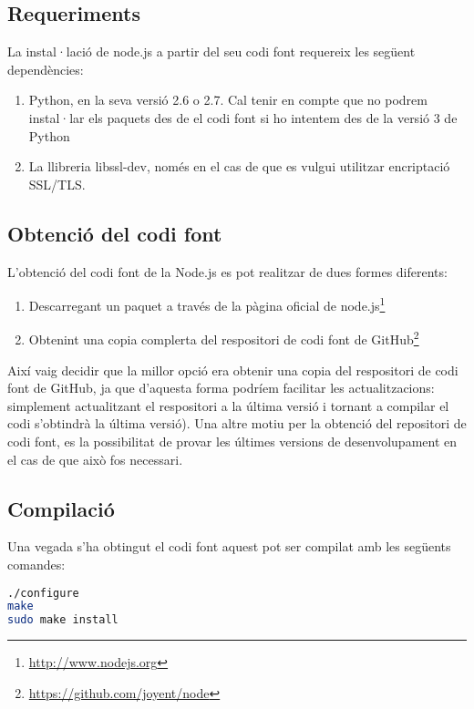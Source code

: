 \subsection{Requeriments}

La instal·lació de node.js a partir del seu codi font requereix les següent dependències:

\begin{enumerate}
    \item{Python, en la seva versió 2.6 o 2.7. Cal tenir en compte que no podrem instal·lar els paquets des de el codi font si ho intentem des de la versió 3 de Python}
    \item{La llibreria libssl-dev, només en el cas de que es vulgui utilitzar encriptació SSL/TLS. }
\end{enumerate}

\subsection{Obtenció del codi font}

L'obtenció del codi font de la Node.js es pot realitzar de dues formes diferents: 

\begin{enumerate}
    \item{Descarregant un paquet a través de la pàgina oficial de node.js\footnote{\url{http://www.nodejs.org}}}
    \item{Obtenint una copia complerta del respositori de codi font de GitHub\footnote{\url{https://github.com/joyent/node}}}
\end{enumerate}

Així vaig decidir que la millor opció era obtenir una copia del respositori de codi font de GitHub, ja que d'aquesta forma podríem facilitar les actualitzacions: simplement actualitzant el respositori a la última versió i tornant a compilar el codi s'obtindrà la última versió). Una altre motiu per la obtenció del repositori de codi font, es la possibilitat de provar les últimes versions de desenvolupament en el cas de que això fos necessari.  

\subsection{Compilació}

Una vegada s'ha obtingut el codi font aquest pot ser compilat amb les següents comandes:  
\begin{lstlisting}[language=bash]
./configure
make
sudo make install
\end{lstlisting}

